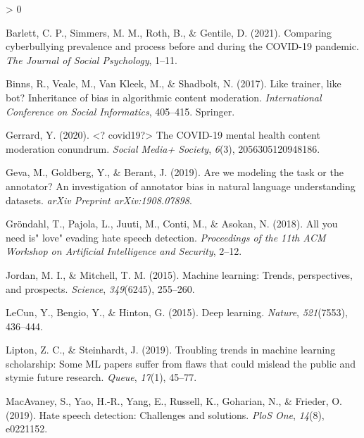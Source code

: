 \documentclass[
  10pt,
  dvipsnames,enabledeprecatedfontcommands]{scrartcl}
\newlength{\cslhangindent}
\newenvironment{CSLReferences}[2] %
 {%
  \setlength{\parindent}{0pt}
  \ifodd #1 \everypar{\setlength{\hangindent}{\cslhangindent}}\ignorespaces\fi
  \ifnum #2 > 0
  \setlength{\parskip}{#2\baselineskip}
  \fi
 }%
 {}
\begin{document}
\vspace{-3mm}

\hypertarget{refs}{}
\begin{CSLReferences}{1}{0}
\leavevmode\hypertarget{ref-barlett2021comparing}{}%
Barlett, C. P., Simmers, M. M., Roth, B., \& Gentile, D. (2021).
Comparing cyberbullying prevalence and process before and during the
COVID-19 pandemic. \emph{The Journal of Social Psychology}, 1--11.

\leavevmode\hypertarget{ref-binns2017like}{}%
Binns, R., Veale, M., Van Kleek, M., \& Shadbolt, N. (2017). Like
trainer, like bot? Inheritance of bias in algorithmic content
moderation. \emph{International Conference on Social Informatics},
405--415. Springer.

\leavevmode\hypertarget{ref-gerrard2020covid19}{}%
Gerrard, Y. (2020). \textless? covid19?\textgreater{} The COVID-19
mental health content moderation conundrum. \emph{Social Media+
Society}, \emph{6}(3), 2056305120948186.

\leavevmode\hypertarget{ref-geva2019we}{}%
Geva, M., Goldberg, Y., \& Berant, J. (2019). Are we modeling the task
or the annotator? An investigation of annotator bias in natural language
understanding datasets. \emph{arXiv Preprint arXiv:1908.07898}.

\leavevmode\hypertarget{ref-grondahl2018all}{}%
Gröndahl, T., Pajola, L., Juuti, M., Conti, M., \& Asokan, N. (2018).
All you need is" love" evading hate speech detection. \emph{Proceedings
of the 11th ACM Workshop on Artificial Intelligence and Security},
2--12.

\leavevmode\hypertarget{ref-jordan2015machine}{}%
Jordan, M. I., \& Mitchell, T. M. (2015). Machine learning: Trends,
perspectives, and prospects. \emph{Science}, \emph{349}(6245), 255--260.

\leavevmode\hypertarget{ref-lecun2015deep}{}%
LeCun, Y., Bengio, Y., \& Hinton, G. (2015). Deep learning.
\emph{Nature}, \emph{521}(7553), 436--444.

\leavevmode\hypertarget{ref-lipton2019troubling}{}%
Lipton, Z. C., \& Steinhardt, J. (2019). Troubling trends in machine
learning scholarship: Some ML papers suffer from flaws that could
mislead the public and stymie future research. \emph{Queue},
\emph{17}(1), 45--77.

\leavevmode\hypertarget{ref-macavaney2019hate}{}%
MacAvaney, S., Yao, H.-R., Yang, E., Russell, K., Goharian, N., \&
Frieder, O. (2019). Hate speech detection: Challenges and solutions.
\emph{PloS One}, \emph{14}(8), e0221152.


\end{CSLReferences}
\end{document}
